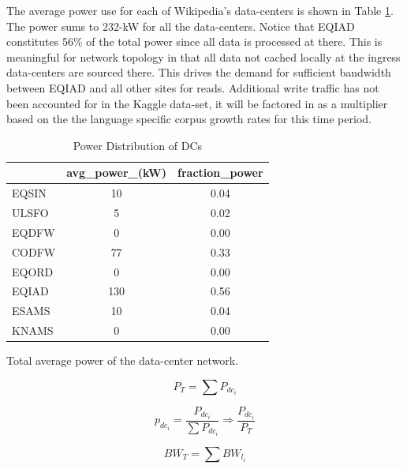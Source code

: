 \documentclass[conference]{IEEEtran}
\begin{document}
The average power use for each of Wikipedia's data-centers is shown in Table \ref{power_dist}. The power sums to 232-kW for all the data-centers. Notice that EQIAD constitutes 56\% of the total power since all data is processed at there. This is meaningful for network topology in that all data not cached locally at the ingress data-centers are sourced there. This drives the demand for sufficient bandwidth between EQIAD and all other sites for reads. Additional write traffic has not been accounted for in the Kaggle data-set, it will be factored in as a multiplier based on the the language specific corpus growth rates for this time period.

\begin{table}[htbp]
\caption{Power Distribution of DCs}
\begin{center}
\begin{tabular}{lcc}
\hline
{} &  avg\_power\_(kW) & fraction\_power \\
\hline
EQSIN &              10 &           0.04 \\
ULSFO &               5 &           0.02 \\
EQDFW &               0 &           0.00 \\
CODFW &              77 &           0.33 \\
EQORD &               0 &           0.00 \\
EQIAD &             130 &           0.56 \\
ESAMS &              10 &           0.04 \\
KNAMS &               0 &           0.00 \\
\hline
\end{tabular}
\label{power_dist}
\end{center}
\end{table}

Total average power of the data-center network. 

\begin{equation}
P_{T}=\sum{P_{dc_i}}\label{eq:total_power}
\end{equation}

\begin{equation}
p_{dc_i}=\frac{P_{dc_i}}{\sum{P_{dc_i}}} \Rightarrow \frac{P_{dc_i}}{P_{T}}\label{eq:percentage}
\end{equation}

\begin{equation}
BW_{T}=\sum{BW_{l_i}}\label{eq:total_network}
\end{equation}
\end{document}
